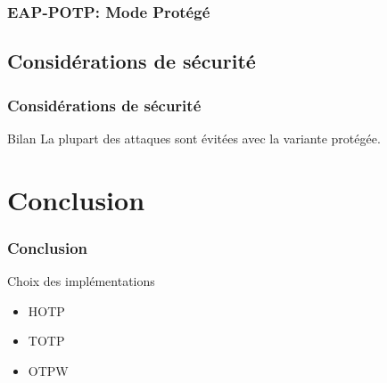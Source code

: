 \documentclass{beamer}
\begin{document}
\begin{frame}
\frametitle{EAP-POTP: Mode Protégé}

\end{frame}

\subsection{Considérations de sécurité}
\begin{frame}
\frametitle{Considérations de sécurité}
\begin{block}{Bilan}
La plupart des attaques sont évitées avec la variante protégée.
\end{block}
\end{frame}

\section{Conclusion}
\begin{frame}
\frametitle{Conclusion}
\begin{block}{Choix des implémentations}
\begin{itemize}
\item HOTP
\item TOTP
\item OTPW
\end{itemize}
\end{block}
\end{frame}
\end{document}
